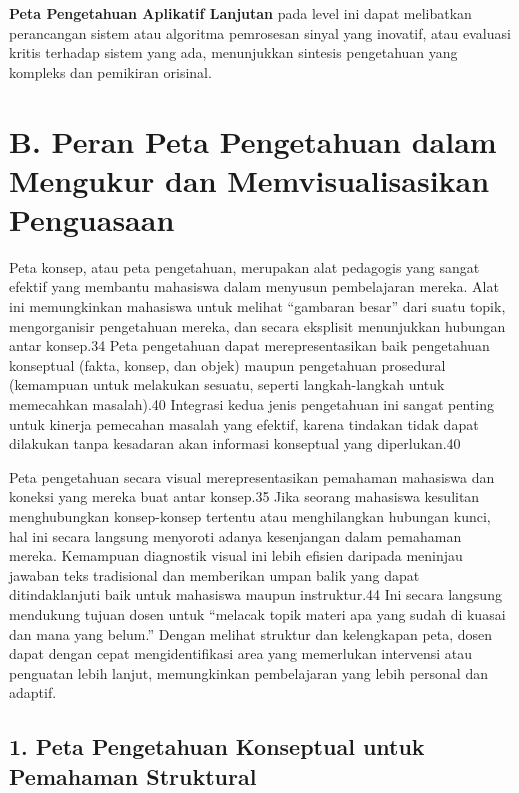 \documentclass[
  letterpaper,
  DIV=11,
  numbers=noendperiod]{scrreprt}
\begin{document}
\textbf{Peta Pengetahuan Aplikatif Lanjutan} pada level ini dapat
melibatkan perancangan sistem atau algoritma pemrosesan sinyal yang
inovatif, atau evaluasi kritis terhadap sistem yang ada, menunjukkan
sintesis pengetahuan yang kompleks dan pemikiran orisinal.

\section{B. Peran Peta Pengetahuan dalam Mengukur dan Memvisualisasikan
Penguasaan}\label{b.-peran-peta-pengetahuan-dalam-mengukur-dan-memvisualisasikan-penguasaan}

Peta konsep, atau peta pengetahuan, merupakan alat pedagogis yang sangat
efektif yang membantu mahasiswa dalam menyusun pembelajaran mereka. Alat
ini memungkinkan mahasiswa untuk melihat ``gambaran besar'' dari suatu
topik, mengorganisir pengetahuan mereka, dan secara eksplisit
menunjukkan hubungan antar konsep.34 Peta pengetahuan dapat
merepresentasikan baik pengetahuan konseptual (fakta, konsep, dan objek)
maupun pengetahuan prosedural (kemampuan untuk melakukan sesuatu,
seperti langkah-langkah untuk memecahkan masalah).40 Integrasi kedua
jenis pengetahuan ini sangat penting untuk kinerja pemecahan masalah
yang efektif, karena tindakan tidak dapat dilakukan tanpa kesadaran akan
informasi konseptual yang diperlukan.40

Peta pengetahuan secara visual merepresentasikan pemahaman mahasiswa dan
koneksi yang mereka buat antar konsep.35 Jika seorang mahasiswa
kesulitan menghubungkan konsep-konsep tertentu atau menghilangkan
hubungan kunci, hal ini secara langsung menyoroti adanya kesenjangan
dalam pemahaman mereka. Kemampuan diagnostik visual ini lebih efisien
daripada meninjau jawaban teks tradisional dan memberikan umpan balik
yang dapat ditindaklanjuti baik untuk mahasiswa maupun instruktur.44 Ini
secara langsung mendukung tujuan dosen untuk ``melacak topik materi apa
yang sudah di kuasai dan mana yang belum.'' Dengan melihat struktur dan
kelengkapan peta, dosen dapat dengan cepat mengidentifikasi area yang
memerlukan intervensi atau penguatan lebih lanjut, memungkinkan
pembelajaran yang lebih personal dan adaptif.

\subsection{1. Peta Pengetahuan Konseptual untuk Pemahaman
Struktural}\label{peta-pengetahuan-konseptual-untuk-pemahaman-struktural}
\end{document}
